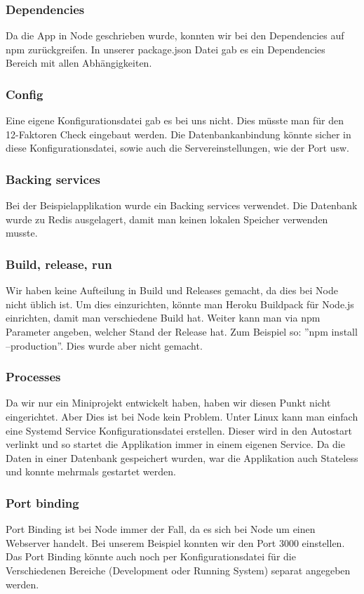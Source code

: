 \subsubsection{Dependencies}
Da die App in Node geschrieben wurde, konnten wir bei den Dependencies auf npm zurückgreifen. In unserer package.json Datei gab es ein Dependencies Bereich mit allen Abhängigkeiten.
\subsubsection{Config}
Eine eigene Konfigurationsdatei gab es bei uns nicht. Dies müsste man für den 12-Faktoren Check eingebaut werden. Die Datenbankanbindung könnte sicher in diese Konfigurationsdatei, sowie auch die Servereinstellungen, wie der Port usw.
\subsubsection{Backing services}
Bei der Beispielapplikation wurde ein Backing services verwendet. Die Datenbank wurde zu Redis ausgelagert, damit man keinen lokalen Speicher verwenden musste. 
\subsubsection{Build, release, run}
Wir haben keine Aufteilung in Build und Releases gemacht, da dies bei Node nicht üblich ist. Um dies einzurichten, könnte man Heroku Buildpack für Node.js einrichten, damit man verschiedene Build hat. Weiter kann man via npm Parameter angeben, welcher Stand der Release hat. Zum Beispiel so: ''npm install --production''. Dies wurde aber nicht gemacht.
\subsubsection{Processes}
Da wir nur ein Miniprojekt entwickelt haben, haben wir diesen Punkt nicht eingerichtet. Aber Dies ist bei Node kein Problem. Unter Linux kann man einfach eine Systemd Service Konfigurationsdatei erstellen. Dieser wird in den Autostart verlinkt und so startet die Applikation immer in einem eigenen Service. Da die Daten in einer Datenbank gespeichert wurden, war die Applikation auch Stateless und konnte mehrmals gestartet werden.
\subsubsection{Port binding}
Port Binding ist bei Node immer der Fall, da es sich bei Node um einen Webserver handelt. Bei unserem Beispiel konnten wir den Port 3000 einstellen. Das Port Binding könnte auch noch per Konfigurationsdatei für die Verschiedenen Bereiche (Development oder Running System) separat angegeben werden.

